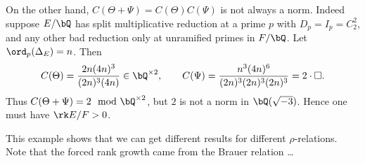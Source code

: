 \begin{example}
    On the other hand, $C(\Theta + \Psi) = C(\Theta)C(\Psi)$ is not always a norm. Indeed suppose $E / \bQ$ has split multiplicative reduction at a prime $p$ with $D_p = I_p = C_2^{2}$, and any other bad reduction only at unramified primes in $F / \bQ$. Let $\ord_p(\Delta_E) = n$. Then 
        $$C(\Theta) = \frac{2n(4n)^3}{(2n)^3 (4n)} \in \bQ^{\times 2}, \qquad
            C(\Psi) = \frac{n^3(4n)^6}{(2n)^3(2n)^3(2n)^3} = 2 \cdot \square.$$
    Thus $C(\Theta + \Psi) = 2 \mod \bQ^{\times 2}$, but $2$ is not a norm in $\bQ(\sqrt{-3})$. Hence one must have $\rk E / F > 0$. 

    This example shows that we can get different results for different $\rho$-relations. Note that the forced rank growth came from the Brauer relation {\color{red} \ldots}


\end{example}